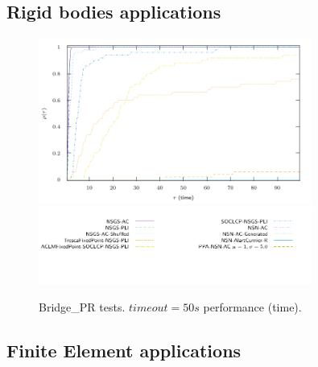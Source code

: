 \subsection{Rigid bodies applications}
\begin{figure}
  \centering
  \includegraphics[width=0.8\textwidth]{../figure/profile-LMGC_Bridge_PR-time_0_100.pdf}
  \includegraphics[width=0.8\textwidth]{../figure/profile-LMGC_Bridge_PR_legend-time_0_100.pdf}
  \caption{Bridge\_PR tests. $timeout=50s $ performance (time). }
  \label{fig:profile-LMGC_Bridge_PR-time}
\end{figure}



\subsection{Finite Element applications}

